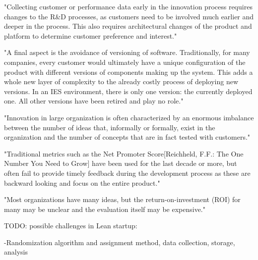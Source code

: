 \documentclass[english]{tktltiki2}
\theoremstyle{definition}
\theoremstyle{remark}
\begin{document}
"Collecting customer or performance data early in the innovation process requires changes to the R\&D processes, as customers need to be involved much earlier and deeper in the process. This also requires architectural changes of the product and platform to determine customer preference and interest." \cite{bosch2012building}

"A final aspect is the avoidance of versioning of software. Traditionally, for many companies, every customer would ultimately have a unique configuration of the product with different versions of components making up the system. This adds a whole new layer of complexity to the already costly process of deploying new versions. In an IES environment, there is only one version: the currently deployed one. All other versions have been retired and play no role." \cite{bosch2012building}

"Innovation in large organization is often characterized by an enormous imbalance between the number of ideas that, informally or formally, exist in the organization and the number of concepts that are in fact tested with customers." \cite{bosch2012building}

"Traditional metrics such as the Net Promoter Score[Reichheld, F.F.: The One Number You Need to Grow] have been used for the last decade or more, but often fail to provide timely feedback during the development process as these are backward looking and focus on the entire product." \cite{bosch2012building}

"Most organizations have many ideas, but the return-on-investment (ROI) for many may be unclear and the evaluation itself may be expensive." \cite{kohavi2007practical}

TODO: possible challenges in Lean startup: \cite{may2012applying}

-Randomization algorithm and assignment method, data collection, storage, analysis \cite{kohavi2007practical}
\end{document}
